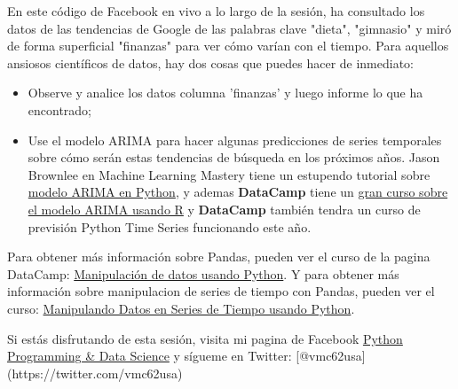 \documentclass[11pt]{article}
\providecommand{\tightlist}{%
      \setlength{\itemsep}{0pt}\setlength{\parskip}{0pt}}
\begin{document}
    En este código de Facebook en vivo a lo largo de la sesión, ha
consultado los datos de las tendencias de Google de las palabras clave
"dieta", "gimnasio" y miró de forma superficial "finanzas" para ver cómo
varían con el tiempo. Para aquellos ansiosos científicos de datos, hay
dos cosas que puedes hacer de inmediato:

\begin{itemize}
\tightlist
\item
  Observe y analice los datos columna 'finanzas' y luego informe lo que
  ha encontrado;
\item
  Use el modelo ARIMA para hacer algunas predicciones de series
  temporales sobre cómo serán estas tendencias de búsqueda en los
  próximos años. Jason Brownlee en Machine Learning Mastery tiene un
  estupendo tutorial sobre
  \href{https://machinelearningmastery.com/arima-for-time-series-forecasting-with-python/}{modelo
  ARIMA en Python}, y ademas \textbf{DataCamp} tiene un
  \href{https://www.datacamp.com/courses/arima-modeling-with-r}{gran
  curso sobre el modelo ARIMA usando R} y \textbf{DataCamp} también
  tendra un curso de previsión Python Time Series funcionando este año.
\end{itemize}

    Para obtener más información sobre Pandas, pueden ver el curso de la
pagina DataCamp:
\href{https://www.datacamp.com/tracks/data-manipulation-with-python}{Manipulación
de datos usando Python}. Y para obtener más información sobre
manipulacion de series de tiempo con Pandas, pueden ver el curso:
\href{https://www.datacamp.com/courses/manipulating-time-series-data-in-python}{Manipulando
Datos en Series de Tiempo usando Python}.

Si estás disfrutando de esta sesión, visita mi pagina de Facebook
\href{https://www.facebook.com/pythonfordatascience}{Python Programming
\& Data Science} y sígueme en Twitter:
{[}@vmc62usa{]}(https://twitter.com/vmc62usa)


    
    
    
    
\end{document}
